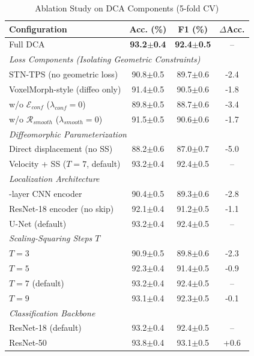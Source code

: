 \documentclass[pdflatex,sn-nature]{sn-jnl}%
\theoremstyle{thmstyleone}%
\theoremstyle{thmstyletwo}%
\theoremstyle{thmstylethree}%
\begin{document}
\begin{table}[t]
\centering
\caption{Ablation Study on DCA Components (5-fold CV)}
\label{tab:ablation}
\begin{tabularx}{\textwidth}{Xccc}
\hline
\textbf{Configuration} & \textbf{Acc. (\%)} & \textbf{F1 (\%)} & \textbf{$\Delta$Acc.} \\
\hline
Full DCA & \textbf{93.2$\pm$0.4} & \textbf{92.4$\pm$0.5} & -- \\
\hline
\multicolumn{4}{l}{\textit{Loss Components (Isolating Geometric Constraints)}} \\
\quad STN-TPS (no geometric loss) & 90.8$\pm$0.5 & 89.7$\pm$0.6 & -2.4 \\
\quad VoxelMorph-style (diffeo only) & 91.4$\pm$0.5 & 90.5$\pm$0.6 & -1.8 \\
\quad w/o $\mathcal{E}_{conf}$ ($\lambda_{conf}=0$) & 89.8$\pm$0.5 & 88.7$\pm$0.6 & -3.4 \\
\quad w/o $\mathcal{R}_{smooth}$ ($\lambda_{smooth}=0$) & 91.5$\pm$0.5 & 90.6$\pm$0.6 & -1.7 \\
\hline
\multicolumn{4}{l}{\textit{Diffeomorphic Parameterization}} \\
\quad Direct displacement (no SS) & 88.2$\pm$0.6 & 87.0$\pm$0.7 & -5.0 \\
\quad Velocity + SS ($T=7$, default) & 93.2$\pm$0.4 & 92.4$\pm$0.5 & -- \\
\hline
\multicolumn{4}{l}{\textit{Localization Architecture}} \\
\quad 3-layer CNN encoder & 90.4$\pm$0.5 & 89.3$\pm$0.6 & -2.8 \\
\quad ResNet-18 encoder (no skip) & 92.1$\pm$0.4 & 91.2$\pm$0.5 & -1.1 \\
\quad U-Net (default) & 93.2$\pm$0.4 & 92.4$\pm$0.5 & -- \\
\hline
\multicolumn{4}{l}{\textit{Scaling-Squaring Steps $T$}} \\
\quad $T=3$ & 90.9$\pm$0.5 & 89.8$\pm$0.6 & -2.3 \\
\quad $T=5$ & 92.3$\pm$0.4 & 91.4$\pm$0.5 & -0.9 \\
\quad $T=7$ (default) & 93.2$\pm$0.4 & 92.4$\pm$0.5 & -- \\
\quad $T=9$ & 93.1$\pm$0.4 & 92.3$\pm$0.5 & -0.1 \\
\hline
\multicolumn{4}{l}{\textit{Classification Backbone}} \\
\quad ResNet-18 (default) & 93.2$\pm$0.4 & 92.4$\pm$0.5 & -- \\
\quad ResNet-50 & 93.8$\pm$0.4 & 93.1$\pm$0.5 & +0.6 \\

\end{tabularx}
\end{table}
\end{document}
